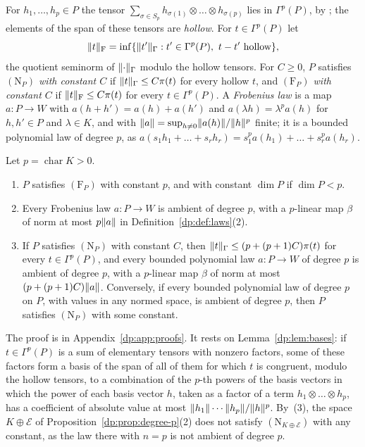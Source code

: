 For $h_1,\dots,h_p\in P$ the tensor $\sum_{\sigma\in S_p}h_{\sigma(1)}\otimes\dots\otimes h_{\sigma(p)}$ lies in $\Gamma^p(P)$, by \cite[(4.2)]{I}; the elements of the span of these tensors are \emph{hollow}. For $t\in\Gamma^p(P)$ let
\[
 \lVert t\rVert_{\mathrm F}=\inf\{\lVert t'\rVert_\Gamma:t'\in\Gamma^p(P),\ t-t'\text{ hollow}\},
\]
the quotient seminorm of $\lVert \cdot\rVert_\Gamma$ modulo the hollow tensors. For $C\ge0$, $P$ satisfies \emph{$(\mathrm N_P)$ with constant $C$} if $\lVert t\rVert_\Gamma\le C\pi(t)$ for every hollow $t$, and \emph{$(\mathrm F_P)$ with constant $C$} if $\lVert t\rVert_{\mathrm F}\le C\pi(t)$ for every $t\in\Gamma^p(P)$. A \emph{Frobenius law} is a map $a\colon P\to W$ with $a(h+h')=a(h)+a(h')$ and $a(\lambda h)=\lambda^pa(h)$ for $h,h'\in P$ and $\lambda\in K$, and with $\lVert a\rVert=\sup_{h\ne0}\lVert a(h)\rVert/\lVert h\rVert^p$ finite; it is a bounded polynomial law of degree $p$, as $a(s_1h_1+\dots+s_rh_r)=s_1^pa(h_1)+\dots+s_r^pa(h_r)$.

\begin{theorem}\label{dp:thm:frobenius}
Let $p=\operatorname{char}K>0$.
\begin{enumerate}
\item $P$ satisfies $(\mathrm F_P)$ with constant $p$, and with constant $\dim P$ if $\dim P<p$.
\item Every Frobenius law $a\colon P\to W$ is ambient of degree $p$, with a $p$\nobreakdash-linear map $\beta$ of norm at most $p\lVert a\rVert$ in Definition~\ref{dp:def:laws}(2).
\item If $P$ satisfies $(\mathrm N_P)$ with constant $C$, then $\lVert t\rVert_\Gamma\le(p+(p+1)C)\pi(t)$ for every $t\in\Gamma^p(P)$, and every bounded polynomial law $a\colon P\to W$ of degree $p$ is ambient of degree $p$, with a $p$\nobreakdash-linear map $\beta$ of norm at most $(p+(p+1)C)\lVert a\rVert$. Conversely, if every bounded polynomial law of degree $p$ on $P$, with values in any normed space, is ambient of degree $p$, then $P$ satisfies $(\mathrm N_P)$ with some constant.
\end{enumerate}
\end{theorem}
The proof is in Appendix~\ref{dp:app:proofs}. It rests on Lemma~\ref{dp:lem:bases}: if $t\in\Gamma^p(P)$ is a sum of elementary tensors with nonzero factors, some of these factors form a basis of the span of all of them for which $t$ is congruent, modulo the hollow tensors, to a combination of the $p$-th powers of the basis vectors in which the power of each basis vector $h$, taken as a factor of a term $h_1\otimes\dots\otimes h_p$, has a coefficient of absolute value at most $\lVert h_1\rVert\cdots\lVert h_p\rVert/\lVert h\rVert^p$. By~(3), the space $K\oplus\mathcal E$ of Proposition~\ref{dp:prop:degree-p}(2) does not satisfy $(\mathrm N_{K\oplus\mathcal E})$ with any constant, as the law there with $n=p$ is not ambient of degree $p$.

